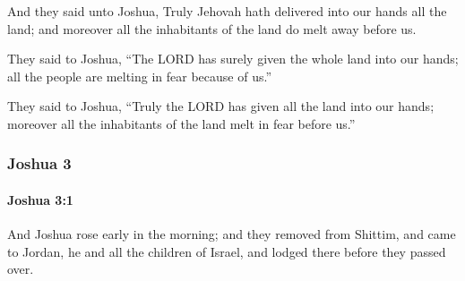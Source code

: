 			\begin{versebox}
					\item[BHS] 
					\item[ASV] And they said unto Joshua, Truly Jehovah hath delivered into our hands all the land; and moreover all the inhabitants of the land do melt away before us.
					\item[NIV] They said to Joshua, “The LORD has surely given the whole land into our hands; all the people are melting in fear because of us.”
					\item[NRSV] They said to Joshua, “Truly the LORD has given all the land into our hands; moreover all the inhabitants of the land melt in fear before us.”
			\end{versebox}
	\subsubsection{Joshua 3} %
		\label{JOSHUA-3}

		\paragraph{Joshua 3:1} %
			\label{JOSHUA-3-1}

			And Joshua rose early in the morning; and they removed from Shittim, and came to Jordan, he and all the children of Israel, and lodged there before they passed over.

